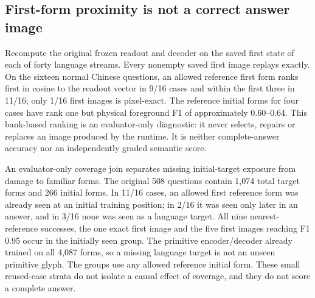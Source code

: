 \documentclass[10pt,a4paper]{article}
\providecommand{\DIFadd}[1]{{\protect\color{blue} \sf #1}} %
\begin{document}
\subsection*{\DIFadd{First-form proximity is not a correct answer image}}
\DIFadd{Recompute the original frozen readout and decoder on the saved first state
of each of forty language streams. Every nonempty saved first image replays
exactly. On the sixteen normal Chinese questions, an allowed reference
first form ranks first in cosine to the readout vector in 9/16 cases and
within the first three in 11/16; only 1/16 first images is pixel-exact.
The reference initial forms for four cases have rank one but physical
foreground F1 of approximately 0.60--0.64. This bank-based ranking is an
evaluator-only diagnostic: it never selects, repairs or replaces an
image produced by the runtime. It is neither complete-answer accuracy nor
an independently graded semantic score.
}

\DIFadd{An evaluator-only coverage join separates missing initial-target exposure
from damage to familiar forms. The original 508 questions contain 1,074 total
target forms and 266 initial forms. In 11/16 cases, an allowed first reference
form was already seen at an initial training position; in 2/16 it was seen
only later in an answer, and in 3/16 none was seen as a language target.
All nine nearest-reference successes, the one exact first image and the five
first images reaching F1 0.95 occur in the initially seen group. The primitive
encoder/decoder already trained on all 4,087 forms, so a missing language
target is not an unseen primitive glyph. The groups use any allowed reference
initial form. These small reused-case strata do not isolate a causal effect
of coverage, and they do not score a complete answer.
}
\end{document}
